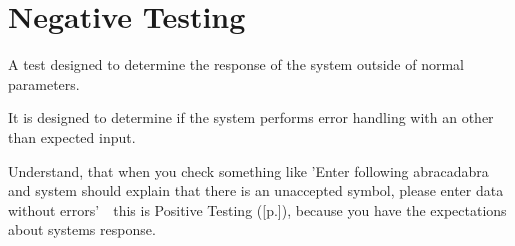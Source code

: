 \section{Negative Testing}
\label{sec:Negative Testing}

A test designed to determine the response of the system outside of normal parameters.

It is designed to determine if the system performs error handling with an other than expected input.

Understand, that when you check something like 'Enter following abracadabra and system should explain that there is an unaccepted symbol, please enter data without errors'~\textemdash~this is Positive Testing ([p.\pageref{sec:Positive Testing}]), because you have the expectations about systems response.
